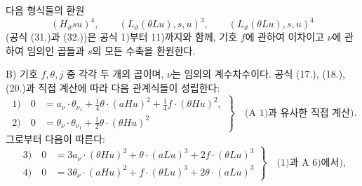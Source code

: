 다음 형식들의 환원
\[
(H_\vartheta su)^4,
\qquad (L_\vartheta(\theta Lu),s,u)^3,
\qquad (L_\vartheta(\theta Lu),s,u)^4
\]
(공식 (31.)과 (32.))은 공식 1)부터 11)까지와 함께, 기호 $f$에 관하여 이차이고 $\nu$에 관하여 임의인 곱들과 $s$의 모든 수축을 환원한다.

B) 기호 $f,\theta,j$ 중 각각 두 개의 곱이며, $\nu$는 임의의 계수차수이다. 공식 (17.), (18.), (20.)과 직접 계산에 따라 다음 관계식들이 성립한다:
\[
\left.
\begin{aligned}
1)\quad 0&=a_\nu\cdot\theta_{\nu_1}+\frac14\theta\cdot(aHu)^2+\frac14f\cdot(\theta Hu)^2,\\
2)\quad 0&=\theta_\nu\cdot\theta_{\nu_1}+\frac12\theta\cdot(\theta Hu)^2
\end{aligned}
\right\}\quad\text{(A 1)과 유사한 직접 계산).}
\]
그로부터 다음이 따른다:
\[
\left.
\begin{aligned}
3)\quad 0&=3a_\nu\cdot(\theta Hu)^2+\theta\cdot(aLu)^3+2f\cdot(\theta Lu)^3\\
4)\quad 0&=3\theta_\nu\cdot(aHu)^2+f\cdot(\theta Lu)^3+2\theta\cdot(aLu)^3
\end{aligned}
\right\}\quad\text{(1)과 A 6)에서),}
\]

